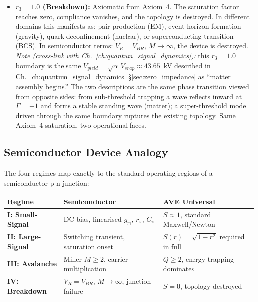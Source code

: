 \begin{itemize}
    In semiconductor terms (an effectively spin-2 / shear-mode analog), the spin-2 boundary is the onset of \textbf{avalanche multiplication}: the Miller factor $M = 1/(1-(V_R/V_{BR})^n)$ reaches $M = 2$, meaning each cycle doubles the stored charge.

    \item \textbf{$r_3 = 1.0$ (Breakdown):} Axiomatic from Axiom~4. The saturation factor reaches zero, compliance vanishes, and the topology is destroyed. In different domains this manifests as: pair production (EM), event horizon formation (gravity), quark deconfinement (nuclear), or superconducting transition (BCS). In semiconductor terms: $V_R = V_{BR}$, $M \to \infty$, the device is destroyed. \textit{Note (cross-link with Ch.~\ref{ch:quantum_signal_dynamics}):} this $r_3 = 1.0$ boundary is the same $V_{yield} = \sqrt{\alpha}\,V_{snap} \approx 43.65$~kV described in Ch.~\ref{ch:quantum_signal_dynamics} \S\ref{sec:zero_impedance} as ``matter assembly begins.'' The two descriptions are the same phase transition viewed from opposite sides: from sub-threshold trapping a wave reflects inward at $\Gamma = -1$\gammaundeclared{} and forms a stable standing wave (matter); a super-threshold mode driven through the same boundary ruptures the existing topology. Same Axiom~4 saturation, two operational faces.
\end{itemize}

\subsection{Semiconductor Device Analogy}

The four regimes map exactly to the standard operating regions of a semiconductor p-n junction:

\begin{center}
\renewcommand{\arraystretch}{1.3}
\begin{tabularx}{\textwidth}{@{}l X X@{}}
\toprule
\textbf{Regime} & \textbf{Semiconductor} & \textbf{AVE Universal} \\
\midrule
\textbf{I: Small-Signal} &
  DC bias, linearised $g_m$, $r_\pi$, $C_\pi$ &
  $S \approx 1$, standard Maxwell/Newton \\
\textbf{II: Large-Signal} &
  Switching transient, saturation onset &
  $S(r) = \sqrt{1-r^2}$ required in full \\
\textbf{III: Avalanche} &
  Miller $M \geq 2$, carrier multiplication &
  $Q \geq 2$, energy trapping dominates \\
\textbf{IV: Breakdown} &
  $V_R = V_{BR}$, $M \to \infty$, junction failure &
  $S = 0$, topology destroyed \\
\bottomrule
\end{tabularx}
\end{center}

